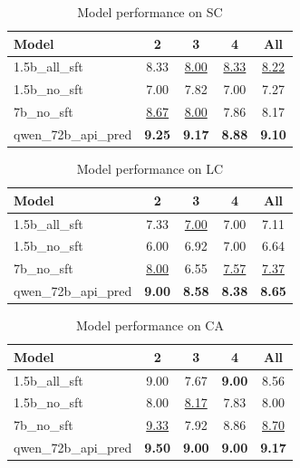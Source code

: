 \begin{table}[ht]
\centering
\begin{tabular}{lcccc}
\toprule
Model & 2 & 3 & 4 & All \\
\midrule
1.5b\_all\_sft & 8.33 & \underline{8.00} & \underline{8.33} & \underline{8.22} \\
1.5b\_no\_sft & 7.00 & 7.82 & 7.00 & 7.27 \\
7b\_no\_sft & \underline{8.67} & \underline{8.00} & 7.86 & 8.17 \\
qwen\_72b\_api\_pred & \textbf{9.25} & \textbf{9.17} & \textbf{8.88} & \textbf{9.10} \\
\bottomrule
\end{tabular}
\caption{Model performance on SC}
\label{tab:sc}
\end{table}

\begin{table}[ht]
\centering
\begin{tabular}{lcccc}
\toprule
Model & 2 & 3 & 4 & All \\
\midrule
1.5b\_all\_sft & 7.33 & \underline{7.00} & 7.00 & 7.11 \\
1.5b\_no\_sft & 6.00 & 6.92 & 7.00 & 6.64 \\
7b\_no\_sft & \underline{8.00} & 6.55 & \underline{7.57} & \underline{7.37} \\
qwen\_72b\_api\_pred & \textbf{9.00} & \textbf{8.58} & \textbf{8.38} & \textbf{8.65} \\
\bottomrule
\end{tabular}
\caption{Model performance on LC}
\label{tab:lc}
\end{table}

\begin{table}[ht]
\centering
\begin{tabular}{lcccc}
\toprule
Model & 2 & 3 & 4 & All \\
\midrule
1.5b\_all\_sft & 9.00 & 7.67 & \textbf{9.00} & 8.56 \\
1.5b\_no\_sft & 8.00 & \underline{8.17} & 7.83 & 8.00 \\
7b\_no\_sft & \underline{9.33} & 7.92 & 8.86 & \underline{8.70} \\
qwen\_72b\_api\_pred & \textbf{9.50} & \textbf{9.00} & \textbf{9.00} & \textbf{9.17} \\
\bottomrule
\end{tabular}
\caption{Model performance on CA}
\label{tab:ca}
\end{table}

